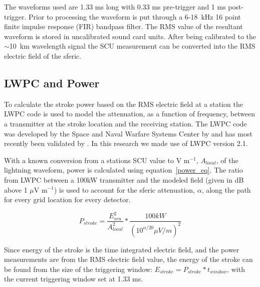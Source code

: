 The waveforms used are 1.33 ms long with 0.33 ms pre-trigger and 1 ms post-trigger.
Prior to processing the waveform is put through a 6-18~kHz 16 point finite impulse response (FIR) bandpass filter.
The RMS value of the resultant waveform is stored in uncalibrated sound card units.
After being calibrated to the $\sim$10~km wavelength signal the SCU measurement can be converted into the RMS electric field of the sferic. 

\subsection{LWPC and Power}

To calculate the stroke power based on the RMS electric field at a station the LWPC code is used to model the attenuation, as a function of frequency, between a transmitter at the stroke location and the receiving station.
The LWPC code was developed by the Space and Naval Warfare Systems Center by \citet{Ferguson1998} and has most recently been validated by \citet{Thomson2011}.
In this research we made use of LWPC version 2.1.

With a known conversion from a stations SCU value to V m$^{-1}$, $A_{local}$, of the lightning waveform, power is calculated using equation~\ref{power_eq}.
The ratio from LWPC between a 100kW transmitter and the modeled field (given in dB above 1 $\mu$V m$^{-1}$) is used to account for the sferic attenuation, $\alpha$, along the path for every grid location for every detector.

\begin{equation}
P_{stroke}=\frac{E_{scu}^2}{A_{local}^2} * \frac{100kW}{(10^{\alpha/20}\mu V/m)^2}
\label{power_eq}
\end{equation}

Since energy of the stroke is the time integrated electric field, and the power measurements are from the RMS electric field value, the energy of the stroke can be found from the size of the triggering window: $E_{stroke}=P_{stroke} * t_{window}$, with the current triggering window set at 1.33 ms.

